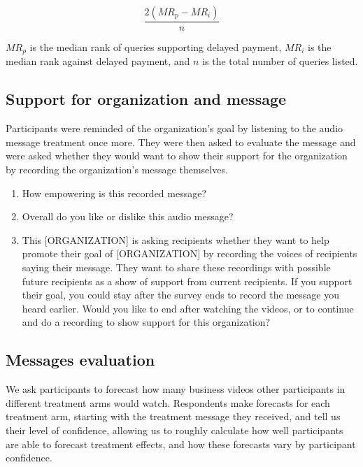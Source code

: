 \documentclass[11pt, a4paper]{article}\usepackage[]{graphicx}\usepackage[]{color}
\begin{document}
        \begin{equation}
            \frac{2 (MR_p - MR_i)}{n}
        \end{equation}

        $MR_p$ is the median rank of queries supporting delayed payment, $MR_i$ is the median rank against delayed payment, and $n$ is the total number of queries listed.

    \subsection{Support for organization and message}

        Participants were reminded of the organization's goal by listening to the audio message treatment once more. They were then asked to evaluate the message and were asked whether they would want to show their support for the organization by recording the organization's message themselves.

        \begin{enumerate}
        \itemsep0em
            \item  How empowering is this recorded message?
            \item  Overall do you like or dislike this audio message?
            \item  This [ORGANIZATION] is asking recipients whether they want to help promote their goal of [ORGANIZATION] by recording the voices of recipients saying their message. They want to share these recordings with possible future recipients as a show of support from current recipients. If you support their goal, you could stay after the survey ends to record the message you heard earlier. Would you like to end after watching the videos, or to continue and do a recording to show support for this organization?
        \end{enumerate}

    \subsection{Messages evaluation}

        We ask participants to forecast how many business videos other participants in different treatment arms would watch. Respondents make forecasts for each treatment arm, starting with the treatment message they received, and tell us their level of confidence, allowing us to roughly calculate how well participants are able to forecast treatment effects, and how these forecasts vary by participant confidence.
\end{document}
